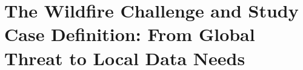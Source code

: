 \chapter{\texorpdfstring{The Wildfire Challenge and Study
Case Definition: From Global Threat to Local Data Needs
}{The Wildfire Challenge and Study Case Definition: From Global Threat to Local Data Needs }}\label{chapter-2-the-wildfire-challenge-and-study-case-definition-from-global-threat-to-local-data-needs}






